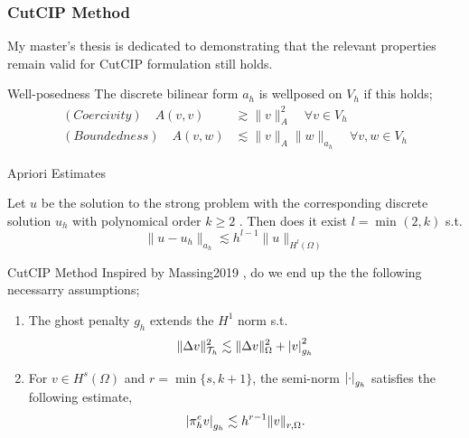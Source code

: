 \begin{frame}
\frametitle{ CutCIP Method}

My master's thesis is dedicated to demonstrating that the relevant properties remain valid for CutCIP formulation still holds.

    \begin{block}{Well-posedness }
         The discrete bilinear form $a_{h}$ is wellposed on $V_{h}$ if this holds; \[
             \begin{split}
                 (Coercivity) \quad  A( v,v) &  \gtrsim  \| v \|_{A }^{ 2 } \quad  \forall v \in  V_{h} \\
            (Boundedness) \quad A( v,w) & \lesssim  \| v \|_{A }^{  }\| w \|_{a_{h} }^{  } \quad  \forall v,w \in  V_{h}
             \end{split}
        \]
    \end{block}

    \begin{block}{Apriori Estimates }

         Let $u$ be the solution to the strong problem with the corresponding discrete solution $u_{h}$ with polynomical order $k\ge 2$ .
        Then does it exist  $l = \min_{} ( 2, k)  $ s.t.
\[
        \| u - u_{h} \|_{a_{h}  }^{  } \lesssim  h^{l-1} \| u \|_{ H^{l} ( \Omega ) }^{  }
\]
    \end{block}
\end{frame}

\begin{frame}{CutCIP Method}
    Inspired by Massing2019 \footnotemark[1], do we end up the the following necessarry assumptions;
\begin{enumerate}
    \item \label{as:EP1} The ghost penalty $g_{h}$ extends the $H^{1}$ norm s.t. \[
    \| \Delta v \|_{ \mathcal{T} _{h} }^{ 2 }  \lesssim \| \Delta  v \|_{ \Omega  }^{  2} + \left\lvert  v  \right\rvert _{g_{h}}^2
    \]
\item \label{as:EP2} For $v \in H^{s}( \Omega ) $ and $r = \min \{s,k+1 \} $, the semi-norm $\left\lvert  \cdot   \right\rvert_{g_{h}} $ satisfies the following estimate, \[
    \left\lvert  \pi _{h}^{e} v  \right\rvert _{g_{h}} \lesssim  h^{r-1} \| v \|_{ r,\Omega  }^{  }.
    \]
\end{enumerate}

\end{frame}

